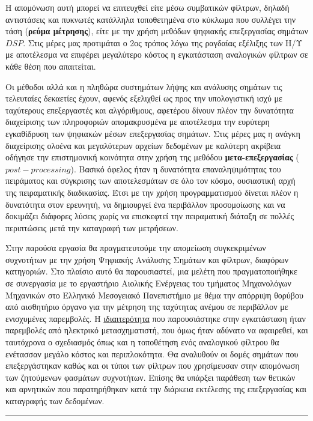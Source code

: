 \documentclass[breaklines=true, 12pt]{article}
\begin{document}
Η απομόνωση αυτή μπορεί να επιτευχθεί είτε μέσω συμβατικών φίλτρων,
δηλαδή αντιστάσεις και πυκνωτές κατάλληλα τοποθετημένα στο κύκλωμα που
συλλέγει την τάση (\textbf{ρεύμα μέτρησης}), είτε με την χρήση μεθόδων ψηφιακής
επεξεργασίας σημάτων \(DSP\).
Στις μέρες μας προτιμάται ο 2ος τρόπος λόγω
της ραγδαίας εξέλιξης των Η/Υ με αποτέλεσμα να επιφέρει μεγαλύτερο
κόστος η εγκατάσταση αναλογικών φίλτρων σε κάθε θέση που απαιτείται.

Οι μέθοδοι αλλά και η πληθώρα συστημάτων λήψης και ανάλυσης σημάτων τις
τελευταίες δεκαετίες έχουν, αφενός εξελιχθεί ως προς την υπολογιστική
ισχύ με ταχύτερους επεξεργαστές και αλγόριθμους, αφετέρου δίνουν
πλέον την δυνατότητα διαχείρισης των πληροφοριών απομακρυσμένα με
αποτέλεσμα την ευρύτερη εγκαθίδρυση των ψηφιακών μέσων επεξεργασίας
σημάτων. Στις μέρες μας η ανάγκη διαχείρισης ολοένα και μεγαλύτερων
αρχείων δεδομένων με καλύτερη ακρίβεια οδήγησε την επιστημονική κοινότητα
στην χρήση της μεθόδου \textbf{μετα-επεξεργασίας} (\(post-processing\)). Βασικό όφελος
ήταν η δυνατότητα επαναληψιμότητας του πειράματος και σύγκρισης των
αποτελεσμάτων σε όλο τον κόσμο, ουσιαστική αρχή της πειραματικής
διαδικασίας. Έτσι με την χρήση προγραμματισμού δίνεται πλέον η
δυνατότητα στον ερευνητή, να δημιουργεί ένα περιβάλλον προσομοίωσης και
να δοκιμάζει διάφορες λύσεις χωρίς να επισκεφτεί την πειραματική διάταξη
σε πολλές περιπτώσεις μετά την καταγραφή των μετρήσεων.

Στην παρούσα εργασία θα πραγματευτούμε την απομείωση συγκεκριμένων
συχνοτήτων με την χρήση Ψηφιακής Ανάλυσης Σημάτων και φίλτρων, διαφόρων
κατηγοριών. Στο πλαίσιο αυτό θα παρουσιαστεί, μια μελέτη που
πραγματοποιήθηκε σε συνεργασία με το εργαστήριο Αιολικής Ενέργειας του
τμήματος Μηχανολόγων Μηχανικών στο Ελληνικό Μεσογειακό Πανεπιστήμιο με
θέμα την απόρριψη θορύβου από αισθητήριο όργανο για την μέτρηση της
ταχύτητας ανέμου σε περιβάλλον με ενισχυμένες παρεμβολές. Η
\uline{ιδιαιτερότητα} που παρουσιάστηκε στην εγκατάσταση ήταν παρεμβολές από
ηλεκτρικό μετασχηματιστή, που όμως ήταν αδύνατο να
αφαιρεθεί, και ταυτόχρονα ο σχεδιασμός όπως και η τοποθέτηση ενός
αναλογικού φίλτρου θα ενέτασσαν μεγάλο κόστος και περιπλοκότητα. Θα
αναλυθούν οι δομές σημάτων που επεξεργάστηκαν καθώς και οι τύποι των
φίλτρων που χρησίμευσαν στην απομόνωση των ζητούμενων φασμάτων συχνοτήτων.
Επίσης θα υπάρξει παράθεση των θετικών και αρνητικών που παρατηρήθηκαν κατά την
διάρκεια εκτέλεσης της επεξεργασίας και καταγραφής των δεδομένων.

\noindent\rule{\textwidth}{0.5pt}
\end{document}
